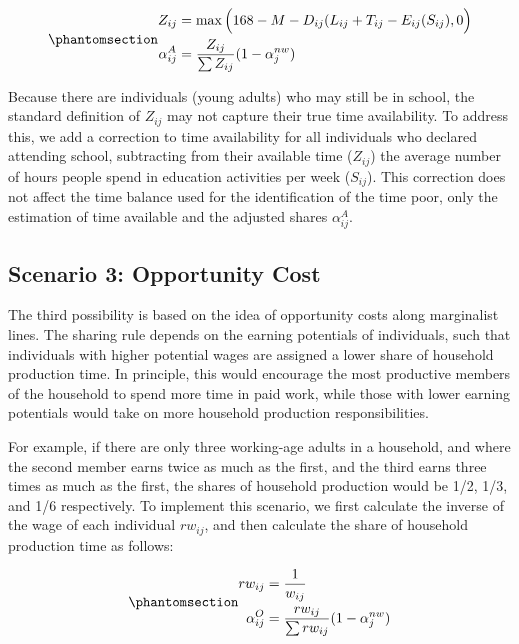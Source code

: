 \documentclass[
  11pt,
]{article}
\begin{document}
\begin{equation}\phantomsection\label{eq-r2}{
\begin{aligned}
Z_{ij} &=\max{\Big(168-M-D_{ij}(L_{ij}+T_{ij}-E_{ij}(S_{ij}),0\Big)} \\
\alpha_{ij}^A &= \frac{Z_{ij}}{\sum Z_{ij}} (1-\alpha_{j}^{nw})
\end{aligned}
}\end{equation}

Because there are individuals (young adults) who may still be in school,
the standard definition of \(Z_{ij}\) may not capture their true time
availability. To address this, we add a correction to time availability
for all individuals who declared attending school, subtracting from
their available time (\(Z_{ij}\)) the average number of hours people
spend in education activities per week (\(S_{ij}\)). This correction
does not affect the time balance used for the identification of the time
poor, only the estimation of time available and the adjusted shares
\(\alpha_{ij}^A\).

\subsection{Scenario 3: Opportunity
Cost}\label{scenario-3-opportunity-cost}

The third possibility is based on the idea of opportunity costs along
marginalist lines. The sharing rule depends on the earning potentials of
individuals, such that individuals with higher potential wages are
assigned a lower share of household production time. In principle, this
would encourage the most productive members of the household to spend
more time in paid work, while those with lower earning potentials would
take on more household production responsibilities.

For example, if there are only three working-age adults in a household,
and where the second member earns twice as much as the first, and the
third earns three times as much as the first, the shares of household
production would be 1/2, 1/3, and 1/6 respectively. To implement this
scenario, we first calculate the inverse of the wage of each individual
\(rw_{ij}\), and then calculate the share of household production time
as follows:

\begin{equation}\phantomsection\label{eq-r3}{\begin{aligned}
rw_{ij} &= \frac{1}{w_{ij}} \\
\alpha_{ij}^O &= \frac{rw_{ij}}{\sum rw_{ij}} (1-\alpha_{j}^{nw})
\end{aligned}
}\end{equation}
\end{document}
